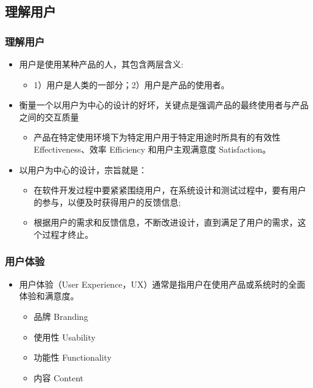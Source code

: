 \documentclass{beamer}
\begin{document}
\subsection{理解用户}
\begin{frame}
	\frametitle{理解用户}
	\beamertemplatetransparentcovereddynamicmedium
	\begin{itemize}[<+->]
		\item 用户是使用某种产品的人，其包含两层含义:
		\begin{itemize}
			\item 1）用户是人类的一部分；2）用户是产品的使用者。
		\end{itemize}
		\item 衡量一个以用户为中心的设计的好坏，关键点是强调产品的最终使用者与产品之间的交互质量
		\begin{itemize}
			\item {\tiny 产品在特定使用环境下为特定用户用于特定用途时}所具有的有效性 Effectiveness、效率 Efficiency 和用户主观满意度 Satisfaction。
		\end{itemize}
		\item 以用户为中心的设计，宗旨就是：
		\begin{itemize}
			\item 在软件开发过程中要紧紧围绕用户，在系统设计和测试过程中，要有用户的参与，以便及时获得用户的反馈信息;
			\item 根据用户的需求和反馈信息，不断改进设计，直到满足了用户的需求，这个过程才终止。
		\end{itemize}
	\end{itemize}
\end{frame}

\begin{frame}
	\frametitle{用户体验}
	\beamertemplatetransparentcovereddynamicmedium
	\begin{itemize}[<+->]
		\item 用户体验（User Experience，UX）通常是指用户在使用产品或系统时的全面体验和满意度。
		\begin{itemize}
			\item 品牌 Branding
			\item 使用性 Usability
			\item 功能性 Functionality
			\item 内容 Content
		\end{itemize}
	\end{itemize}
\end{frame}
\end{document}
